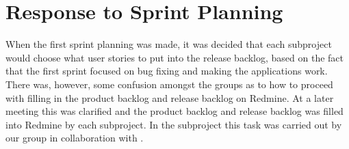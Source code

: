 \section{Response to Sprint Planning}
When the first sprint planning was made, it was decided that each subproject would choose what user stories to put into the release backlog, based on the fact that the first sprint focused on bug fixing and making the applications work. There was, however, some confusion amongst the groups as to how to proceed with filling in the product backlog and release backlog on Redmine. At a later meeting this was clarified and the product backlog and release backlog was filled into Redmine by each subproject. In the \bd subproject this task was carried out by our group in collaboration with .
